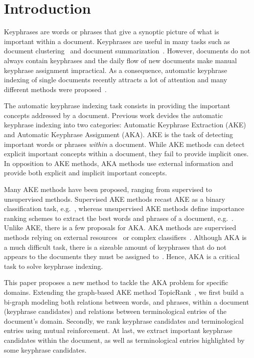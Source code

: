 \section{Introduction}
\label{sec: introduction}
  Keyphrases are words or phrases that give a synoptic picture of what is
  important within a document. Keyphrases are useful in many tasks such as
  document clustering~\cite{han2007webdocumentclustering} and document
  summarization~\cite{litvak2008graphbased}. However, documents do not always
  contain keyphrases and the daily flow of new documents make manual keyphrase
  assignment impractical. As a consequence, automatic keyphrase indexing of
  single documents recently attracts a lot of attention and many different
  methods were proposed~\cite{hasan2014state_of_the_art}.

  The automatic keyphrase indexing task consists in providing the important
  concepts addressed by a document. Previous work devides the automatic
  keyphrase indexing into two categories: Automatic Keyphrase Extraction (AKE)
  and Automatic Keyphrase Assignment (AKA). AKE is the task of detecting
  important words or phrases \emph{within} a document. While AKE methods can
  detect explicit important concepts within a document, they fail to provide
  implicit ones. In opposition to AKE methods, AKA methods use external
  information and provide both explicit and implicit important concepts.

  Many AKE methods have been proposed, ranging from supervised to unsupervised
  methods. Supervised AKE methods recast AKE as a binary classification task,
  e.g.~\cite{witten1999kea}, whereas unsupervised AKE methods define importance
  ranking schemes to extract the best words and phrases of a document,
  e.g.~\cite{mihalcea2004textrank}. Unlike AKE, there is a few proposals for
  AKA. AKA methods are supervised methods relying on external
  resources~\cite{medelyan2006keathesaurus} or complex
  classifiers~\cite{liu2011vocabularygap}. Although AKA is a much difficult
  task, there is a sizeable amount of keyphrases that do not appears to the
  documents they must be assigned
  to~\cite[find a better ref.]{bougouin2013topicrank}. Hence, AKA is a critical
  task to solve keyphrase indexing.

  This paper proposes a new method to tackle the AKA problem for specific
  domains. Extending the graph-based AKE method
  TopicRank~\cite{bougouin2013topicrank}, we first build a bi-graph modeling
  both relations between words, and phrases, within a document (keyphrase
  candidates) and relations between terminological entries of the document's
  domain. Secondly, we rank keyphrase candidates and terminological entries
  using mutual reinforcement. At last, we extract important keyphrase candidates
  within the document, as well as terminological entries highlighted by some
  keyphrase candidates.
